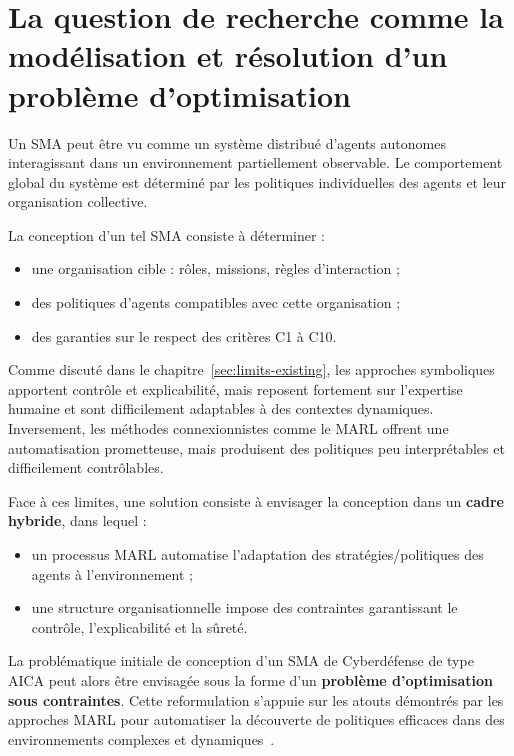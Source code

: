 \section{La question de recherche comme la modélisation et résolution d'un problème d'optimisation}

Un \ac{SMA} peut être vu comme un système distribué d'agents autonomes interagissant dans un environnement partiellement observable. Le comportement global du système est déterminé par les politiques individuelles des agents et leur organisation collective.

La conception d'un tel \ac{SMA} consiste à déterminer :
\begin{itemize}
    \item une organisation cible : rôles, missions, règles d'interaction ;
    \item des politiques d'agents compatibles avec cette organisation ;
    \item des garanties sur le respect des critères C1 à C10.
\end{itemize}

Comme discuté dans le chapitre~\ref{sec:limits-existing}, les approches symboliques apportent contrôle et explicabilité, mais reposent fortement sur l'expertise humaine et sont difficilement adaptables à des contextes dynamiques. Inversement, les méthodes connexionnistes comme le \ac{MARL} offrent une automatisation prometteuse, mais produisent des politiques peu interprétables et difficilement contrôlables.

Face à ces limites, une solution consiste à envisager la conception  dans un \textbf{cadre hybride}, dans lequel :
\begin{itemize}
    \item un processus \ac{MARL} automatise l'adaptation des stratégies/politiques des agents à l'environnement ;
    \item une structure organisationnelle impose des contraintes garantissant le contrôle, l'explicabilité et la sûreté.
\end{itemize}

La problématique initiale de conception d'un \ac{SMA} de Cyberdéfense de type \ac{AICA} peut alors être envisagée sous la forme d'un \textbf{problème d'optimisation sous contraintes}. Cette reformulation s'appuie sur les atouts démontrés par les approches \ac{MARL} pour automatiser la découverte de politiques efficaces dans des environnements complexes et dynamiques~\cite{Zhang2021, Papoudakis2021}.

